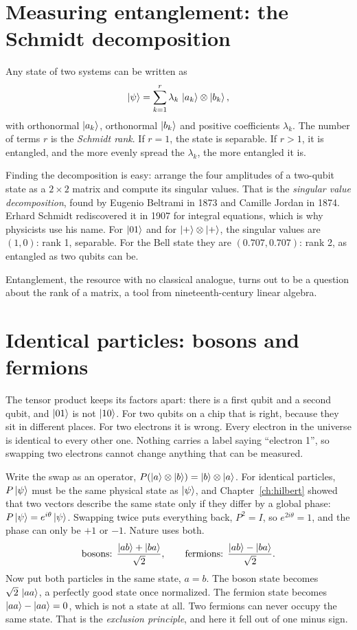 \section{Measuring entanglement: the Schmidt decomposition}

Any state of two systems can be written as
\[
  \ket{\psi} = \sum_{k=1}^{r} \lambda_k\,\ket{a_k}\otimes\ket{b_k},
\]
with orthonormal $\ket{a_k}$, orthonormal $\ket{b_k}$ and positive coefficients
$\lambda_k$. The number of terms $r$ is the \emph{Schmidt rank}. If $r = 1$, the
state is separable. If $r > 1$, it is entangled, and the more evenly spread the
$\lambda_k$, the more entangled it is.

Finding the decomposition is easy: arrange the four amplitudes of a two-qubit
state as a $2\times2$ matrix and compute its singular values. That is the
\emph{singular value decomposition}, found by Eugenio Beltrami in 1873 and Camille
Jordan in 1874. Erhard Schmidt rediscovered it in 1907 for integral equations,
which is why physicists use his name. For $\ket{01}$ and for
$\ket{+}\otimes\ket{+}$, the singular values are $(1, 0)$: rank 1, separable. For
the Bell state they are $(0.707, 0.707)$: rank 2, as entangled as two qubits can be.

Entanglement, the resource with no classical analogue, turns out to be a question
about the rank of a matrix, a tool from nineteenth-century linear algebra.

\section{Identical particles: bosons and fermions}\label{sec:identical}

The tensor product keeps its factors apart: there is a first qubit and a second
qubit, and $\ket{01}$ is not $\ket{10}$. For two qubits on a chip that is right,
because they sit in different places. For two electrons it is wrong. Every
electron in the universe is identical to every other one. Nothing carries a label
saying ``electron 1'', so swapping two electrons cannot change anything that can be
measured.

Write the swap as an operator, $P(\ket a \otimes \ket b) = \ket b \otimes \ket a$.
For identical particles, $P\ket\psi$ must be the same physical state as $\ket\psi$,
and Chapter~\ref{ch:hilbert} showed that two vectors describe the same state only if
they differ by a global phase: $P\ket\psi = e^{i\theta}\ket\psi$. Swapping twice
puts everything back, $P^2 = I$, so $e^{2i\theta} = 1$, and the phase can only be
$+1$ or $-1$. Nature uses both.
\[
  \text{bosons: } \frac{\ket{ab} + \ket{ba}}{\sqrt2},
  \qquad
  \text{fermions: } \frac{\ket{ab} - \ket{ba}}{\sqrt2}.
\]
Now put both particles in the same state, $a = b$. The boson state becomes
$\sqrt2\,\ket{aa}$, a perfectly good state once normalized. The fermion state
becomes $\ket{aa} - \ket{aa} = 0$, which is not a state at all. Two fermions can
never occupy the same state. That is the \emph{exclusion principle}, and here it
fell out of one minus sign.

